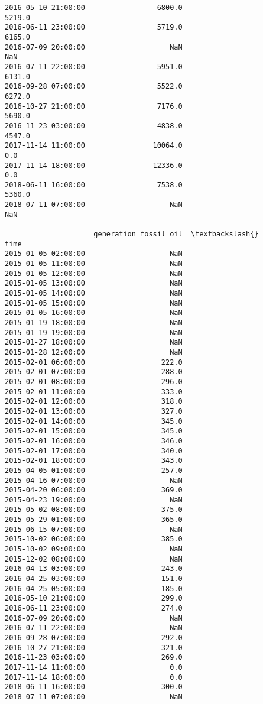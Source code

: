 \documentclass[11pt]{article}
\begin{document}
\begin{tcolorbox}[breakable, size=fbox, boxrule=.5pt, pad at break*=1mm, opacityfill=0]
\begin{Verbatim}[commandchars=\\\{\}]
2016-05-10 21:00:00                 6800.0                       5219.0
2016-06-11 23:00:00                 5719.0                       6165.0
2016-07-09 20:00:00                    NaN                          NaN
2016-07-11 22:00:00                 5951.0                       6131.0
2016-09-28 07:00:00                 5522.0                       6272.0
2016-10-27 21:00:00                 7176.0                       5690.0
2016-11-23 03:00:00                 4838.0                       4547.0
2017-11-14 11:00:00                10064.0                          0.0
2017-11-14 18:00:00                12336.0                          0.0
2018-06-11 16:00:00                 7538.0                       5360.0
2018-07-11 07:00:00                    NaN                          NaN

                     generation fossil oil  \textbackslash{}
time
2015-01-05 02:00:00                    NaN
2015-01-05 11:00:00                    NaN
2015-01-05 12:00:00                    NaN
2015-01-05 13:00:00                    NaN
2015-01-05 14:00:00                    NaN
2015-01-05 15:00:00                    NaN
2015-01-05 16:00:00                    NaN
2015-01-19 18:00:00                    NaN
2015-01-19 19:00:00                    NaN
2015-01-27 18:00:00                    NaN
2015-01-28 12:00:00                    NaN
2015-02-01 06:00:00                  222.0
2015-02-01 07:00:00                  288.0
2015-02-01 08:00:00                  296.0
2015-02-01 11:00:00                  333.0
2015-02-01 12:00:00                  318.0
2015-02-01 13:00:00                  327.0
2015-02-01 14:00:00                  345.0
2015-02-01 15:00:00                  345.0
2015-02-01 16:00:00                  346.0
2015-02-01 17:00:00                  340.0
2015-02-01 18:00:00                  343.0
2015-04-05 01:00:00                  257.0
2015-04-16 07:00:00                    NaN
2015-04-20 06:00:00                  369.0
2015-04-23 19:00:00                    NaN
2015-05-02 08:00:00                  375.0
2015-05-29 01:00:00                  365.0
2015-06-15 07:00:00                    NaN
2015-10-02 06:00:00                  385.0
2015-10-02 09:00:00                    NaN
2015-12-02 08:00:00                    NaN
2016-04-13 03:00:00                  243.0
2016-04-25 03:00:00                  151.0
2016-04-25 05:00:00                  185.0
2016-05-10 21:00:00                  299.0
2016-06-11 23:00:00                  274.0
2016-07-09 20:00:00                    NaN
2016-07-11 22:00:00                    NaN
2016-09-28 07:00:00                  292.0
2016-10-27 21:00:00                  321.0
2016-11-23 03:00:00                  269.0
2017-11-14 11:00:00                    0.0
2017-11-14 18:00:00                    0.0
2018-06-11 16:00:00                  300.0
2018-07-11 07:00:00                    NaN


\end{Verbatim}
\end{tcolorbox}
\end{document}
